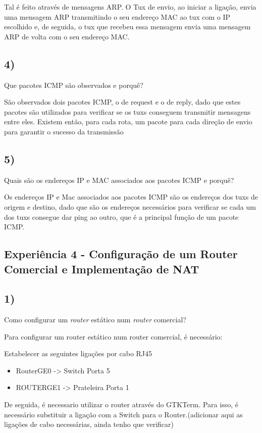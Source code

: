 \documentclass[11pt]{article}
\begin{document}
Tal é feito através de mensagens ARP. O Tux de envio, ao iniciar a ligação, envia uma mensagem ARP transmitindo o seu endereço MAC ao tux com o IP escolhido e, de seguida, o tux que recebeu essa mensagem envia uma mensagem ARP de volta com o seu endereço MAC.

\subsection{4)} Que pacotes ICMP são observados e porquê?

São observados dois pacotes ICMP, o de request e o de reply, dado que estes pacotes são utilizados para verificar se os tuxs conseguem transmitir mensagens entre eles. Existem então, para cada rota, um pacote para cada direção de envio para garantir o sucesso da transmissão

\subsection{5)} Quais são os endereços IP e MAC associados aos pacotes ICMP e porquê?

Os endereços IP e Mac associados aos pacotes ICMP são os endereços dos tuxs de origem e destino, dado que são os endereços necessários para verificar se cada um dos tuxs consegue dar ping ao outro, que é a principal função de um pacote ICMP. 

\subsection{Experiência 4 - Configuração de um Router Comercial e Implementação de NAT}

\subsection{1)} Como configurar um \emph{router} estático num \emph{router} comercial?

Para configurar um router estático num router comercial, é necessário:

Estabelecer as seguintes ligações por cabo RJ45
\begin{itemize}
\item RouterGE0 -> Switch Porta 5
\item ROUTERGE1  -> Prateleira Porta 1  
\end{itemize}

De seguida, é necessario utilizar o router através do GTKTerm. Para isso, é necessário substituir a ligação com a Switch para o Router.(adicionar aqui as ligações de cabo necessárias, ainda tenho que verificar)
\end{document}
